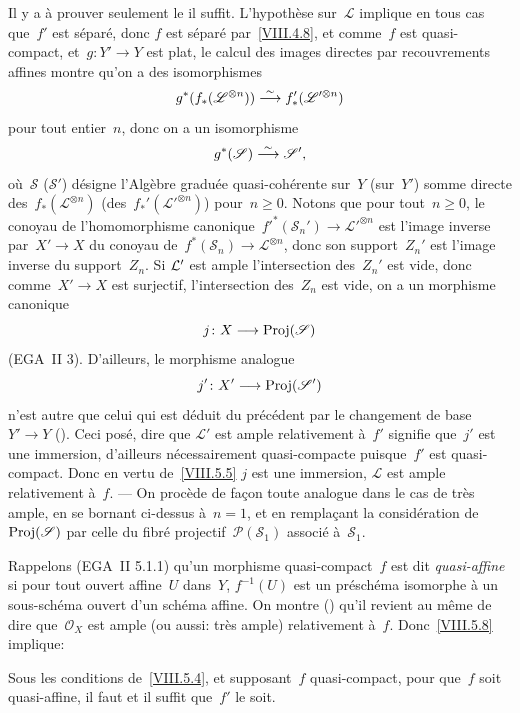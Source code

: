 Il y a \`a prouver seulement le \og il suffit\fg. L'hypoth\`ese
sur~$\mathcal{L}$ implique en tous cas que~$f'$ est s\'epar\'e,
donc $f$ est s\'epar\'e par~\ref{VIII.4.8}, et comme~$f$ est
quasi-compact, et~$g\colon Y'\to Y$ est plat, le calcul des images
directes par recouvrements affines montre qu'on a des isomorphismes
$$
g^*(f_*(\mathscr{L}^{\otimes n}))\overset{\sim}{\longrightarrow}
f_*'(\mathscr{L}'^{\otimes n})
$$
pour tout entier~$n$, donc on a un isomorphisme
$$
g^*(\mathscr{S})\overset{\sim}{\longrightarrow} \mathscr{S}',
$$
o\`u~$\mathcal{S}$ (\resp $\mathcal{S}'$) d\'esigne l'Alg\`ebre
gradu\'ee quasi-coh\'erente sur~$Y$ (\resp sur~$Y'$) somme directe
des~$f_*(\mathcal{L}^{\otimes n})$
(\resp des~$f_*'(\mathcal{L}'^{\otimes n})$) pour~$n\geq
0$. Notons que pour tout~$n\geq 0$, le conoyau de l'homomorphisme
canonique~$f'^*(\mathcal{S}_{n}')\to \mathcal{L}'^{\otimes n}$
est l'image inverse par~$X'\to X$ du conoyau
de~$f^*(\mathcal{S}_{n})\to \mathcal{L}^{\otimes n}$, donc son
support~$Z_{n}'$ est l'image inverse du support~$Z_{n}$. Si
$\cal{L}'$
est ample l'intersection des~$Z_{n}'$ est vide, donc comme~$X'\to X$
est surjectif, l'intersection des~$Z_{n}$ est vide, \ie on a un
morphisme canonique
$$
j\colon X\to \Proj(\mathcal{S})
$$
(EGA~II 3). D'ailleurs, le morphisme analogue
$$
j'\colon X'\to \Proj(\mathcal{S}')
$$
n'est autre que celui qui est d\'eduit du pr\'ec\'edent par le
changement de base~$Y'\to Y$ (\loccit). Ceci pos\'e, dire que
$\mathcal{L}'$ est ample relativement \`a~$f'$ signifie que~$j'$ est
une immersion, d'ailleurs n\'ecessairement quasi-compacte
puisque~$f'$ est quasi-compact. Donc en vertu de~\ref{VIII.5.5} $j$
est une immersion, \ie $\mathcal{L}$ est ample relativement
\`a~$f$. --- On proc\`ede de fa\c con toute analogue dans le cas
de \og tr\`es
ample\fg, en se bornant ci-dessus \`a~$n=1$, et en rempla\c cant la
consid\'eration de~$\operatorname{Proj}(\mathscr{S})$ par celle du fibr\'e
projectif~$\mathcal{P}(\mathcal{S}_{1})$ associ\'e
\`a~$\mathcal{S}_{1}$.

Rappelons (EGA~II 5.1.1) qu'un morphisme quasi-compact~$f$ est dit
\emph{quasi-affine} si pour tout ouvert affine~$U$ dans~$Y$,
$f^{-1}(U)$ est un pr\'esch\'ema isomorphe \`a un
sous-sch\'ema ouvert d'un sch\'ema affine. On montre (\loccit)
qu'il revient au m\^eme de dire que~$\mathcal{O}_{X}$ est ample (ou
aussi: tr\`es ample) relativement \`a~$f$. Donc~\ref{VIII.5.8}
implique:

\begin{corollaire}
\label{VIII.5.9}
Sous les conditions de~\ref{VIII.5.4}, et supposant~$f$ quasi-compact,
pour que~$f$ soit quasi-affine, il faut et il suffit que~$f'$ le soit.
\end{corollaire}

